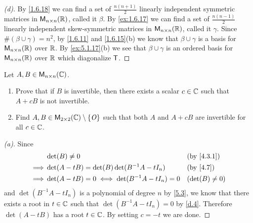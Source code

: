 \begin{proof}[(d)]
	By \cref{1.6.18} we can find a set of \(\frac{n(n + 1)}{2}\) linearly independent symmetric matrices in \(\mathsf{M}_{{n} \times n}({\mathbb{R}})\), called it \(\beta\).
	By \cref{ex:1.6.17} we can find a set of \(\frac{n(n - 1)}{2}\) linearly independent skew-symmetric matrices in \(\mathsf{M}_{{n} \times n}({\mathbb{R}})\), called it \(\gamma\).
	Since \(\#(\beta \cup \gamma) = n^2\), by \cref{1.6.11} and \cref{1.6.15}(b) we know that \(\beta \cup \gamma\) is a basis for \(\mathsf{M}_{{n} \times n}({\mathbb{R}})\) over \(\mathbb{R}\).
	By \cref{ex:5.1.17}(b) we see that \(\beta \cup \gamma\) is an ordered basis for \(\mathsf{M}_{{n} \times n}({\mathbb{R}})\) over \(\mathbb{R}\) which diagonalize \(\mathsf{T}\).
\end{proof}

\begin{ex}\label{ex:5.1.18}
	Let \(A, B \in \mathsf{M}_{{n} \times n}({\mathbb{C}})\).
	\begin{enumerate}
		\item Prove that if \(B\) is invertible, then there exists a scalar \(c \in \mathbb{C}\) such that \(A + cB\) is not invertible.
		\item Find \(A, B \in \mathsf{M}_{{2} \times 2}({\mathbb{C}}) \setminus \left\lbrace\mathit{O}\right\rbrace\) such that both \(A\) and \(A + cB\) are invertible for all \(c \in \mathbb{C}\).
	\end{enumerate}
\end{ex}

\begin{proof}[(a)]
	Since
	\begin{align*}
		         & \det(B) \neq 0                                   &  & \by{4.3.1}       \\
		\implies & \det(A - tB) = \det(B) \det(B^{-1} A - t I_n)    &  & \by{4.7}         \\
		\implies & \det(A - tB) = 0 \iff \det(B^{-1} A - t I_n) = 0 &  & (\det(B) \neq 0)
	\end{align*}
	and \(\det(B^{-1} A - t I_n)\) is a polynomial of degree \(n\) by \cref{5.3}, we know that there exists a root in \(t \in \mathbb{C}\) such that \(\det(B^{-1} A - t I_n) = 0\) by \cref{d.4}.
	Therefore \(\det(A - tB)\) has a root \(t \in \mathbb{C}\).
	By setting \(c = -t\) we are done.
\end{proof}

